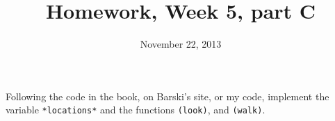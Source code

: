 \documentclass{article}
\title{Homework, Week 5, part C}
\date{November 22, 2013}
\begin{document}
\maketitle{}

\paragraph{}Following the code in the book, on Barski's site, or my code, implement the variable \texttt{*locations*} and the functions \texttt{(look)}, and \texttt{(walk)}.
\end{document}
